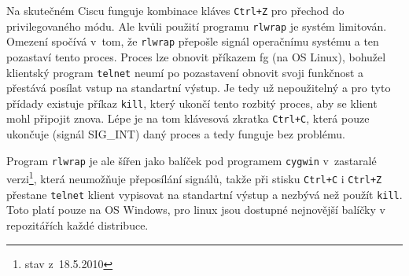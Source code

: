 Na skutečném Ciscu funguje kombinace kláves \verb|Ctrl+Z| pro přechod do privilegovaného módu. Ale kvůli použití programu \verb|rlwrap| je systém limitován. Omezení spočívá v~tom, že \verb|rlwrap| přepošle signál operačnímu systému a ten pozastaví tento proces. Proces lze obnovit příkazem fg (na OS Linux), bohužel klientský program \verb|telnet| neumí po pozastavení obnovit svoji funkčnost a přestává posílat vstup na standartní výstup. Je tedy už nepoužitelný a pro tyto přídady existuje příkaz \verb|kill|, který ukončí tento rozbitý proces, aby se klient mohl připojit znova. Lépe je na tom klávesová zkratka \verb|Ctrl+C|, která pouze ukončuje (signál SIG\_INT) daný proces a tedy funguje bez problému. 

Program \verb|rlwrap| je ale šířen jako balíček pod programem \verb|cygwin| v~zastaralé verzi\footnote{stav z~18.5.2010}, která neumožňuje přeposílání signálů, takže při stisku \verb|Ctrl+C| i \verb|Ctrl+Z| přestane \verb|telnet| klient vypisovat na standartní výstup a nezbývá než použít \verb|kill|. Toto platí pouze na OS Windows, pro linux jsou dostupné nejnovější balíčky v repozitářích každé distribuce.



